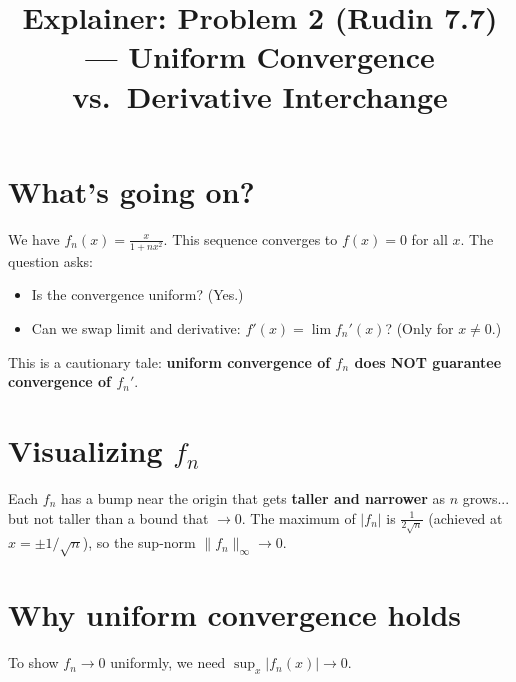 \documentclass[12pt]{article}
\title{Explainer: Problem 2 (Rudin 7.7) --- Uniform Convergence vs.\ Derivative Interchange}
\author{}
\date{}
\begin{document}
\maketitle

\section*{What's going on?}
We have $f_n(x) = \frac{x}{1 + nx^2}$. This sequence converges to $f(x) = 0$ for all $x$. The question asks:
\begin{itemize}
    \item Is the convergence uniform? (Yes.)
    \item Can we swap limit and derivative: $f'(x) = \lim f_n'(x)$? (Only for $x \neq 0$.)
\end{itemize}

This is a cautionary tale: \textbf{uniform convergence of $f_n$ does NOT guarantee convergence of $f_n'$}.

\section*{Visualizing $f_n$}

\begin{center}
\end{center}

Each $f_n$ has a bump near the origin that gets \textbf{taller and narrower} as $n$ grows... but not taller than a bound that $\to 0$. The maximum of $|f_n|$ is $\frac{1}{2\sqrt{n}}$ (achieved at $x = \pm 1/\sqrt{n}$), so the sup-norm $\|f_n\|_\infty \to 0$.

\section*{Why uniform convergence holds}

To show $f_n \to 0$ uniformly, we need $\sup_x |f_n(x)| \to 0$.
\end{document}
